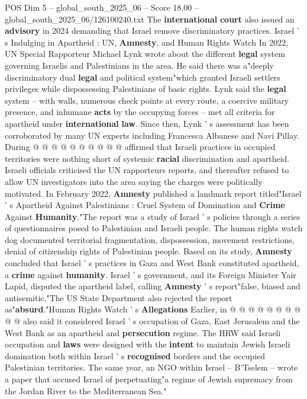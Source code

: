 \begin{textsample}{POS Dim 5 – global\_south\_2025\_06 – Score 18.00 – global\_south\_2025\_06/126100240.txt}
The \textbf{international} \textbf{court} also issued an \textbf{advisory} in 2024 demanding that Israel remove discriminatory practices.
Israel ' s Indulging in Apartheid : UN, \textbf{Amnesty}, and Human Rights Watch In 2022, UN Special Rapporteur Michael Lynk wrote about the different \textbf{legal} system governing Israelis and Palestinians in the area.
He said there was a"deeply discriminatory dual \textbf{legal} and political system"which granted Israeli settlers privileges while dispossessing Palestinians of basic rights.
Lynk said the \textbf{legal} system -- with walls, numerous check points at every route, a coercive military presence, and inhumane \textbf{acts} by the occupying forces -- met all criteria for apartheid under \textbf{international} \textbf{law}.
Since then, Lynk ' s assessment has been corroborated by many UN experts including Francesca Albanese and Navi Pillay.
During @ @ @ @ @ @ @ @ @ @ affirmed that Israeli practices in occupied territories were nothing short of systemic \textbf{racial} discrimination and apartheid.
Israeli officials criticised the UN rapporteurs reports, and thereafter refused to allow UN investigators into the area saying the charges were politically motivated.
In February 2022, \textbf{Amnesty} published a landmark report titled"Israel ' s Apartheid Against Palestinians : Cruel System of Domination and \textbf{Crime} Against \textbf{Humanity}."The report was a study of Israel ' s policies through a series of questionnaires posed to Palestinian and Israeli people.
The human rights watch dog documented territorial fragmentation, dispossession, movement restrictions, denial of citizenship rights of Palestinian people.
Based on its study, \textbf{Amnesty} concluded that Israel ' s practices in Gaza and West Bank constituted apartheid, a \textbf{crime} against \textbf{humanity}.
Israel ' s government, and its Foreign Minister Yair Lapid, disputed the apartheid label, calling \textbf{Amnesty} ' s report"false, biased and antisemitic."The US State Department also rejected the report as"\textbf{absurd}."Human Rights Watch ' s \textbf{Allegations} Earlier, in @ @ @ @ @ @ @ @ @ @ also said it considered Israel ' s occupation of Gaza, East Jerusalem and the West Bank as an apartheid and \textbf{persecution} regime.
The HRW said Israeli occupation and \textbf{laws} were designed with the \textbf{intent} to maintain Jewish Israeli domination both within Israel ' s \textbf{recognised} borders and the occupied Palestinian territories.
The same year, an NGO within Israel -- B'Tselem -- wrote a paper that accused Israel of perpetuating"a regime of Jewish supremacy from the Jordan River to the Mediterranean Sea."

\end{textsample}
